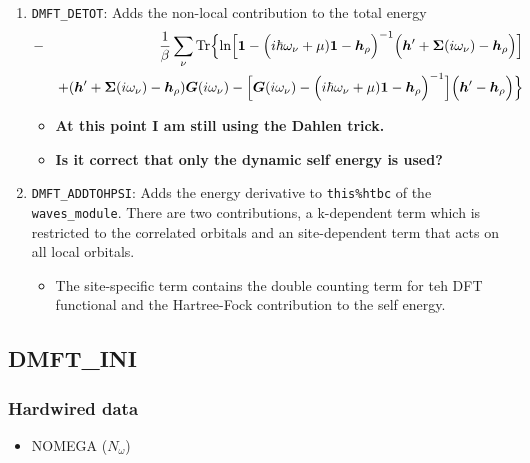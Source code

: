 \documentclass[11pt,a4paper]{report}
\newcommand{\mat}[1]{\bm{#1}}  %
\begin{document}
\begin{enumerate}
%
\item \verb|DMFT_DETOT|: Adds the non-local contribution to the total energy
\begin{eqnarray}
&-&\frac{1}{\beta}\sum_\nu\Tr\Bigl\lbrace
\ln\Bigl[
\mat{1}-
\Bigl(i\hbar\omega_\nu+\mu)\mat{1}-\mat{h}_{\rho}\Bigr)^{-1}
\Bigl(\mat{h}'+\mat{\Sigma}(i\omega_\nu)-\mat{h}_{\rho}\Bigr)
\Bigr]
\nonumber\\&&
+(\mat{h}'+\mat{\Sigma}(i\omega_\nu)-\mat{h}_\rho)\mat{G}(i\omega_\nu)
-
\Bigl[
\mat{G}(i\omega_\nu)
-\Bigl(i\hbar\omega_\nu+\mu)\mat{1}-\mat{h}_{\rho}\Bigr)^{-1}
\Bigr]
\Bigl(\mat{h}'-\mat{h}_\rho\Bigr)\Bigr\rbrace
\end{eqnarray}
\begin{itemize}
  \item \textbf{At this point I am still using the Dahlen trick.}  
  \item \textbf{Is it correct that only the dynamic self energy is used?}
\end{itemize}
%
\item \verb|DMFT_ADDTOHPSI|: Adds the energy derivative to
  \verb|this%htbc| of the \verb|waves_module|. There are two
  contributions, a k-dependent term which is restricted to the
  correlated orbitals and an site-dependent term that acts on all
  local orbitals.
\begin{itemize}
\item The site-specific term contains the double counting term for teh
  DFT functional and the Hartree-Fock contribution to the self energy.
\end{itemize}
\end{enumerate}



\subsection{DMFT\_INI}

\subsubsection{Hardwired data}
\begin{itemize}
\item NOMEGA ($N_\omega$)
\end{itemize}
\end{document}

